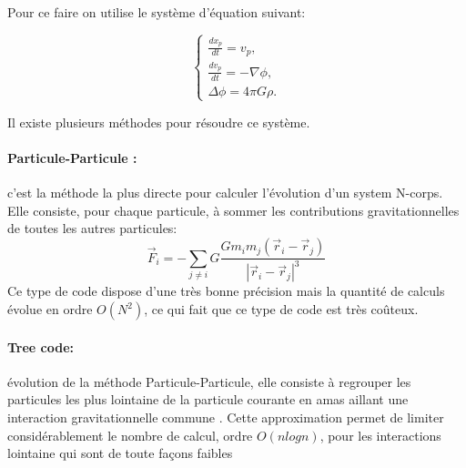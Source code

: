 Pour ce faire on utilise le système d'équation suivant:

\begin{equation}
\begin{cases}
\frac{d{x}_p}{dt} = { v}_p, \\
\frac{d{ v}_p}{dt} = -\nabla \phi , \\
\Delta \phi= 4\pi G \rho.
\end{cases}
\label{eq:Ncorps}
\end{equation}

Il existe plusieurs méthodes pour résoudre ce système.
\paragraph{Particule-Particule : } c'est la méthode la plus directe pour calculer l'évolution d'un system N-corps. 
Elle consiste, pour chaque particule, à sommer les contributions gravitationnelles de toutes les autres particules:
\begin{equation}
\vec{F}_i=-\sum_{j\neq i} G \frac{G m_i m_j(\vec{r}_i - \vec{r}_j) }{ |\vec{r}_i - \vec{r}_j |^3}
\end{equation}
Ce type de code dispose d'une très bonne précision mais la quantité de calculs évolue en ordre $O(N^2)$, ce qui fait que ce type de code est très coûteux.

\paragraph{Tree code: } évolution de la méthode Particule-Particule, elle consiste à regrouper les particules les plus lointaine de la particule courante en amas aillant une interaction gravitationnelle commune \citep{1986Natur.324..446B}.
Cette approximation permet de limiter considérablement le nombre de calcul, ordre $O(n log n)$, pour les interactions lointaine qui sont de toute façons faibles 



%


